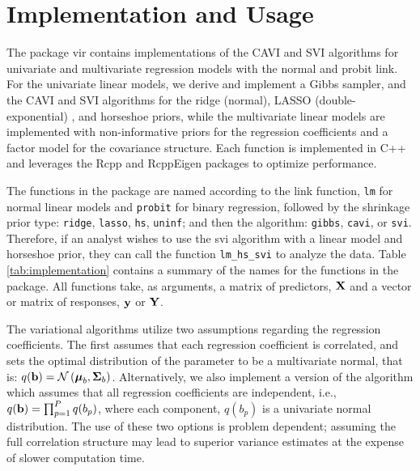 \documentclass[]{article}
\newcommand{\V}[1]{{\bm{\mathbf{\MakeLowercase{#1}}}}} %
\newcommand{\M}[1]{{\bm{\mathbf{\MakeUppercase{#1}}}}} %
\def\b{{\bf b}}
\def\X{{\bf X}}
\def\Y{{\bf Y}}
\def\y{{\bf y}}
\def \vmu{{\V{\mu}}}
\def \msigma{{\M{\Sigma}}}
\let\code=\texttt
\let\proglang=\textsf
\newcommand{\pkg}[1]{{\fontseries{b}\selectfont #1}}
\begin{document}
\section{Implementation and Usage} \label{sec:vir:usage}

The package \pkg{vir} contains implementations of the CAVI and SVI algorithms
for univariate and multivariate regression models with the normal and probit
link.  For the univariate linear models, we derive and implement a Gibbs
sampler, and the CAVI and SVI algorithms for the ridge (normal), LASSO
(double-exponential) \citep{park2008lasso}, and horseshoe
\citep{carvalho2010horseshoe, makalic2015simple} priors, while the multivariate
linear models are implemented with non-informative priors for the regression
coefficients and a factor model for the covariance structure. Each function is
implemented in \proglang{C++} and leverages the \pkg{Rcpp} \citep{rcpp} and
\pkg{RcppEigen} \citep{bates2013fast} packages to optimize performance. 

The functions in the package are named according to the link function, \code{lm}
for normal linear models and \code{probit} for binary regression, followed by
the shrinkage prior type: \code{ridge}, \code{lasso}, \code{hs}, \code{uninf};
and then the algorithm: \code{gibbs}, \code{cavi}, or \code{svi}. Therefore, if
an analyst wishes to use the svi algorithm with a linear model and horseshoe
prior, they can call the function \code{lm\_hs\_svi} to analyze the data. Table
\ref{tab:implementation} contains a summary of the names for the functions in
the package.  All functions take, as arguments, a matrix of predictors, $\X$ and
a vector or matrix of responses, $\y$ or $\Y$. 

The variational algorithms utilize two assumptions regarding the regression
coefficients. The first assumes that each regression coefficient is correlated,
and sets the optimal distribution of the parameter to be a multivariate normal,
that is: $q(\b) = \mathcal{N} \left(\vmu_b, \msigma_b \right)$. Alternatively,
we also implement a version of the algorithm which assumes that all regression
coefficients are independent, i.e., $q(\b) = \prod_{p = 1}^P q(b_p)$, where each
component, $q(b_p)$ is a univariate normal distribution. The use of these two
options is problem dependent; assuming the full correlation structure may lead
to superior variance estimates at the expense of slower computation time. 
\end{document}
